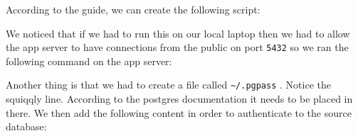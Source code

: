 According to the guide, we can create the following script:

\begin{Shaded}
\begin{Highlighting}[]

 
 \OperatorTok{\textgreater{}}

 
  \OperatorTok{\textless{}}\OperatorTok{\textgreater{}}
\end{Highlighting}
\end{Shaded}

We noticed that if we had to run this on our local laptop then we had to allow the app server to have connections from the public on port \texttt{5432} so we ran the following command on the app server:

\begin{Shaded}
\begin{Highlighting}[]
\end{Highlighting}
\end{Shaded}

Another thing is that we had to create a file called \texttt{\textasciitilde{}/.pgpass} . Notice the squiqqly line. According to the postgres documentation it needs to be placed in there. We then add the following content in order to authenticate to the source database:

\begin{Shaded}
\begin{Highlighting}[]
\OperatorTok{\textless{}}\OperatorTok{\textgreater{}}
\end{Highlighting}
\end{Shaded}

